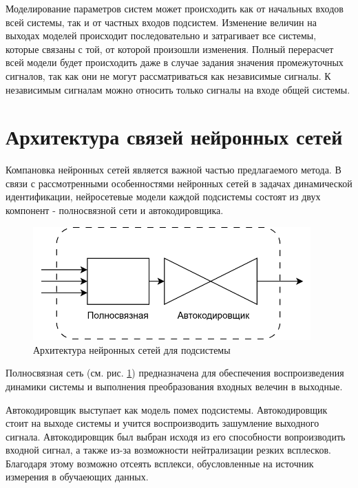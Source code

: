 Моделирование параметров систем может происходить как от начальных входов всей
системы, так и от частных входов подсистем. Изменение величин на выходах
моделей происходит последовательно и затрагивает все системы, которые связаны с
той, от которой произошли изменения.
Полный перерасчет всей модели будет происходить даже в случае задания значения
промежуточных сигналов, так как они не могут рассматриваться как независимые
сигналы. К независимым сигналам можно относить только сигналы на входе общей
системы.

\section{Архитектура связей нейронных сетей}

Компановка нейронных сетей является важной частью предлагаемого метода. В связи с рассмотренными особенностями нейронных сетей в задачах динамической идентификации, нейросетевые модели каждой подсистемы состоят из двух компонент - полносвязной сети и автокодировщика. 

\begin{figure}[H]
  \begin{center}
    \includegraphics[width=0.95\textwidth]{figures/nn_system.png}
  \end{center}
  \caption{Архитектура нейронных сетей для подсистемы}\label{fig:nn:system}
\end{figure}

Полносвязная сеть (см. рис. \ref{fig:nn:system}) предназначена для обеспечения воспроизведения динамики системы и выполнения преобразования входных велечин в выходные. 

Автокодировщик выступает как модель помех подсистемы. Автокодировщик стоит на выходе системы и учится воспроизводить зашумление выходного сигнала. Автокодировщик был выбран исходя из его способности вопроизводить входной сигнал, а также из-за возможности нейтрализации резких всплесков. Благодаря этому возможно отсеять всплекси, обусловленные на источник измерения в обучаеющих данных. 


